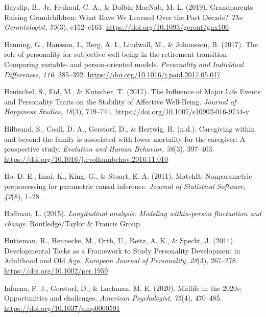 \documentclass[
  english,
  man, noextraspace]{apa7}
\begin{document}
\leavevmode\hypertarget{ref-hayslipGrandparentsRaisingGrandchildren2019}{}%
Hayslip, B., Jr, Fruhauf, C. A., \& Dolbin-MacNab, M. L. (2019). Grandparents Raising Grandchildren: What Have We Learned Over the Past Decade? \emph{The Gerontologist}, \emph{59}(3), e152--e163. \url{https://doi.org/10.1093/geront/gnx106}

\leavevmode\hypertarget{ref-henningRolePersonalitySubjective2017}{}%
Henning, G., Hansson, I., Berg, A. I., Lindwall, M., \& Johansson, B. (2017). The role of personality for subjective well-being in the retirement transition Comparing variable- and person-oriented models. \emph{Personality and Individual Differences}, \emph{116}, 385--392. \url{https://doi.org/10.1016/j.paid.2017.05.017}

\leavevmode\hypertarget{ref-hentschelInfluenceMajorLife2017}{}%
Hentschel, S., Eid, M., \& Kutscher, T. (2017). The Influence of Major Life Events and Personality Traits on the Stability of Affective Well-Being. \emph{Journal of Happiness Studies}, \emph{18}(3), 719--741. \url{https://doi.org/10.1007/s10902-016-9744-y}

\leavevmode\hypertarget{ref-hilbrandCaregivingFamilyAssociated2017}{}%
Hilbrand, S., Coall, D. A., Gerstorf, D., \& Hertwig, R. (n.d.). Caregiving within and beyond the family is associated with lower mortality for the caregiver: A prospective study. \emph{Evolution and Human Behavior}, \emph{38}(3), 397--403. \url{https://doi.org/10.1016/j.evolhumbehav.2016.11.010}

\leavevmode\hypertarget{ref-MatchIt2011}{}%
Ho, D. E., Imai, K., King, G., \& Stuart, E. A. (2011). MatchIt: Nonparametric preprocessing for parametric causal inference. \emph{Journal of Statistical Software}, \emph{42}(8), 1--28.

\leavevmode\hypertarget{ref-hoffmanLongitudinalAnalysisModeling2015}{}%
Hoffman, L. (2015). \emph{Longitudinal analysis: Modeling within-person fluctuation and change}. Routledge/Taylor \& Francis Group.

\leavevmode\hypertarget{ref-huttemanDevelopmentalTasksFramework2014}{}%
Hutteman, R., Hennecke, M., Orth, U., Reitz, A. K., \& Specht, J. (2014). Developmental Tasks as a Framework to Study Personality Development in Adulthood and Old Age. \emph{European Journal of Personality}, \emph{28}(3), 267--278. \url{https://doi.org/10.1002/per.1959}

\leavevmode\hypertarget{ref-infurnaMidlife2020sOpportunities2020}{}%
Infurna, F. J., Gerstorf, D., \& Lachman, M. E. (2020). Midlife in the 2020s: Opportunities and challenges. \emph{American Psychologist}, \emph{75}(4), 470--485. \url{https://doi.org/10.1037/amp0000591}
\end{document}
